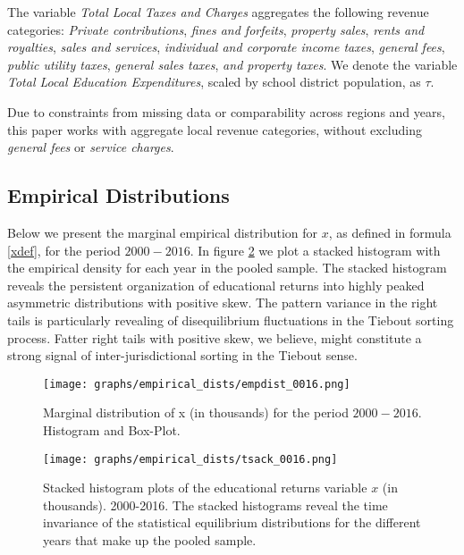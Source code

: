 The variable \emph{Total Local Taxes and Charges} aggregates the following
revenue categories: \emph{Private contributions}, \emph{fines and forfeits},
\emph{property sales}, \emph{rents and royalties}, \emph{sales and services},
\emph{individual and corporate income taxes}, \emph{general fees}, \emph{public
utility taxes}, \emph{general sales taxes}, \emph{and property taxes}. We denote
the variable \emph{Total Local Education Expenditures}, scaled by school
district population, as $\tau$. 

\medskip





Due to constraints from missing data or comparability across regions
and years, this paper works with aggregate local revenue categories,
without excluding \emph{general fees} or \emph{service charges}.



\subsection{Empirical Distributions}
\label{sec-2-2}

Below we present the marginal empirical distribution for $x$, as
defined in formula \ref{xdef}, for the period $2000-2016$. In figure
\ref{tbstack} we plot a stacked histogram with the empirical density
for each year in the pooled sample.  The stacked histogram reveals the
persistent organization of educational returns into highly peaked
asymmetric distributions with positive skew. The pattern variance in
the right tails is particularly revealing of disequilibrium
fluctuations in the Tiebout sorting process. Fatter right tails with
positive skew, we believe, might constitute a strong signal of
inter-jurisdictional sorting in the Tiebout sense.

\begin{figure}[htb]
\centering
\texttt{[image: graphs/empirical\_dists/empdist\_0016.png]}
\caption{\label{mdistx}Marginal distribution of x (in thousands) for the period $2000-2016$. Histogram and Box-Plot.}
\end{figure}


\begin{figure}[htb]
\centering
\texttt{[image: graphs/empirical\_dists/tsack\_0016.png]}
\caption{\label{tbstack}Stacked histogram plots of the educational returns variable $x$ (in thousands). 2000-2016. The stacked histograms reveal the time invariance of the statistical equilibrium distributions for the different years that make up the pooled sample.}
\end{figure}


